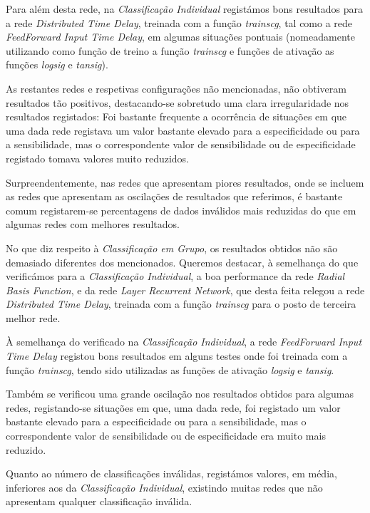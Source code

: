 \documentclass{article}
\begin{document}
Para além desta rede, na \emph{Classificação Individual} registámos bons resultados para a rede \emph{Distributed Time Delay}, treinada com a função \emph{trainscg}, tal como a rede \emph{FeedForward Input Time Delay}, em algumas situações pontuais (nomeadamente utilizando como função de treino a função \emph{trainscg} e funções de ativação as funções \emph{logsig} e \emph{tansig}).

As restantes redes e respetivas configurações não mencionadas, não obtiveram resultados tão positivos, destacando-se sobretudo uma clara irregularidade nos resultados registados: Foi bastante frequente a ocorrência de situações em que uma dada rede registava um valor bastante elevado para a especificidade ou para a sensibilidade, mas o correspondente valor de sensibilidade ou de especificidade registado tomava valores muito reduzidos.

Surpreendentemente, nas redes que apresentam piores resultados, onde se incluem as redes que apresentam as oscilações de resultados que referimos, é bastante comum registarem-se percentagens de dados inválidos mais reduzidas do que em algumas redes com melhores resultados.

No que diz respeito à \emph{Classificação em Grupo}, os resultados obtidos não são demasiado diferentes dos mencionados. Queremos destacar, à semelhança do que verificámos para a \emph{Classificação Individual}, a boa performance da rede \emph{Radial Basis Function}, e da rede \emph{Layer Recurrent Network}, que desta feita relegou a rede \emph{Distributed Time Delay}, treinada com a função \emph{trainscg} para o posto de terceira melhor rede.

À semelhança do verificado na \emph{Classificação Individual}, a rede \emph{FeedForward Input Time Delay} registou bons resultados em alguns testes onde foi treinada com a função \emph{trainscg}, tendo sido utilizadas as funções de ativação \emph{logsig} e \emph{tansig}.

Também se verificou uma grande oscilação nos resultados obtidos para algumas redes, registando-se situações em que, uma dada rede, foi registado um valor bastante elevado para a especificidade ou para a sensibilidade, mas o correspondente valor de sensibilidade ou de especificidade era muito mais reduzido.

Quanto ao número de classificações inválidas, registámos valores, em média, inferiores aos da \emph{Classificação Individual}, existindo muitas redes que não apresentam qualquer classificação inválida.
\end{document}
